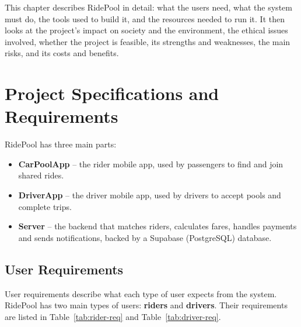 
This chapter describes RidePool in detail: what the users need, what the
system must do, the tools used to build it, and the resources needed to run
it. It then looks at the project's impact on society and the environment, the
ethical issues involved, whether the project is feasible, its strengths and
weaknesses, the main risks, and its costs and benefits.

\section{Project Specifications and Requirements}
\label{sec:specifications}

RidePool has three main parts:

\begin{itemize}
  \item \textbf{CarPoolApp} -- the rider mobile app, used by passengers to find
        and join shared rides.
  \item \textbf{DriverApp} -- the driver mobile app, used by drivers to accept
        pools and complete trips.
  \item \textbf{Server} -- the backend that matches riders, calculates fares,
        handles payments and sends notifications, backed by a Supabase
        (PostgreSQL) database.
\end{itemize}

\subsection{User Requirements}
\label{subsec:user-requirements}

User requirements describe what each type of user expects from the system.
RidePool has two main types of users: \textbf{riders} and \textbf{drivers}.
Their requirements are listed in Table~\ref{tab:rider-req} and
Table~\ref{tab:driver-req}.

